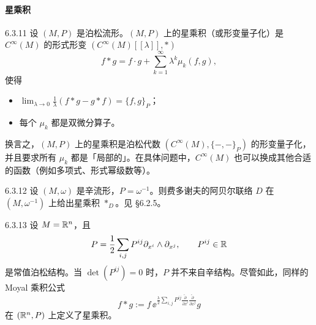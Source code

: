 \paragraph{星乘积}\par

\begin{definition}{6.3.11}
  设 $(M,P)$ 是泊松流形。$(M,P)$ 上的星乘积（或形变量子化）是 $C^\infty(M)$ 的形式形变 $(C^\infty(M)[[\lambda]],\ast)$
  \[
  f\ast g=f\cdot g+\sum_{k=1}^\infty\lambda^k\mu_k(f,g),
  \]
  使得
  \begin{itemize}
    \item $\displaystyle\lim_{\lambda\to0}\frac1\lambda(f\ast g-g\ast f)=\{f,g\}_P$；
    \item 每个 $\mu_k$ 都是双微分算子。
  \end{itemize}
\end{definition}

换言之，$(M,P)$ 上的星乘积是泊松代数 $(C^\infty(M),\{-,-\}_P)$ 的形变量子化，并且要求所有 $\mu_k$ 都是「局部的」。在具体问题中，$C^\infty(M)$ 也可以换成其他合适的函数（例如多项式、形式幂级数等）。

\begin{example}{6.3.12}
  设 $(M,\omega)$ 是辛流形，$P=\omega^{-1}$。则费多谢夫的阿贝尔联络 $D$ 在 $(M,\omega^{-1})$ 上给出星乘积 $\ast_D$。见 §6.2.5。
\end{example}

\begin{example}{6.3.13}
  设 $M=\mathbb{R}^n$，且
  \[
  P=\frac12\sum_{i,j}P^{ij}\partial_{x^i}\wedge\partial_{x^j},
  \qquad P^{ij}\in\mathbb{R}
  \]
  是常值泊松结构。当 $\det(P^{ij})=0$ 时，$P$ 并不来自辛结构。尽管如此，同样的 Moyal 乘积公式
  \[
  f\ast g:=f\,\ee^{\frac{\lambda}{2}\sum_{i,j}P^{ij}
  \frac{\overleftarrow{\partial}}{\partial x^i}
  \frac{\overleftarrow{\partial}}{\partial x^j}}g
  \]
  在 $(\mathbb{R}^n,P)$ 上定义了星乘积。
\end{example}

